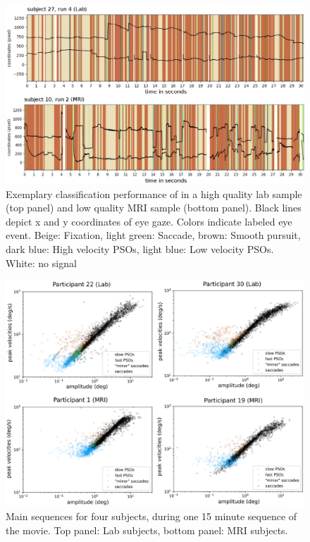     \begin{figure}[h!]
        \includegraphics[width=1\textwidth]{img/remodnav.eps}
        \caption{Exemplary classification
        performance of \remodnav in a high quality lab sample (top panel) and low quality MRI sample (bottom panel).
        Black lines depict x and y coordinates of eye gaze. Colors indicate labeled eye event. Beige: Fixation,
        light green: Saccade, brown: Smooth pursuit, dark blue: High velocity PSOs, light blue: Low velocity PSOs.
        White: no signal}
        \label{fig:remodnav}
    \end{figure}

    \begin{figure}[h!]
        \includegraphics[width=1\textwidth]{img/main_sequences.eps}
        \caption{Main sequences for four subjects, during one 15 minute sequence of
        the movie. Top panel: Lab subjects, bottom panel: MRI subjects.}
        \label{fig:mains}
    \end{figure}

